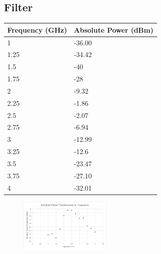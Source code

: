 \documentclass[conference]{IEEEtran}
\begin{document}
\subsection{Filter}

\begin{table}[htbp]
\begin{tabular}{|l|l|}
\hline
\textbf{Frequency (GHz)} & \textbf{Absolute Power (dBm)} \\ \hline
1                        & -36.00                        \\ \hline
1.25                     & -34.42                        \\ \hline
1.5                      & -40                           \\ \hline
1.75                     & -28                           \\ \hline
2                        & -9.32                         \\ \hline
2.25                     & -1.86                         \\ \hline
2.5                      & -2.07                         \\ \hline
2.75                     & -6.94                         \\ \hline
3                        & -12.99                        \\ \hline
3.25                     & -12.6                         \\ \hline
3.5                      & -23.47                        \\ \hline
3.75                     & -27.10                        \\ \hline
4                        & -32.01                        \\ \hline
\end{tabular}
\end{table}

\begin{figure}[htbp]
\centerline{\includegraphics[width=0.4\textwidth]{filter_transmission.png}}
\label{Filter Power Transmission}
\end{figure}
\end{document}
